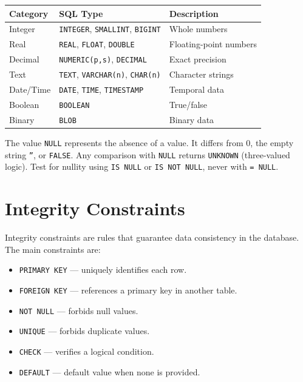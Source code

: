 \begin{keyformulas}[title=\textbf{Common SQL Data Types}]
\begin{center}
\begin{tabular}{lll}
\toprule
\textbf{Category} & \textbf{SQL Type} & \textbf{Description} \\
\midrule
Integer & \texttt{INTEGER}, \texttt{SMALLINT}, \texttt{BIGINT} & Whole numbers \\
Real & \texttt{REAL}, \texttt{FLOAT}, \texttt{DOUBLE} & Floating-point numbers \\
Decimal & \texttt{NUMERIC(p,s)}, \texttt{DECIMAL} & Exact precision \\
Text & \texttt{TEXT}, \texttt{VARCHAR(n)}, \texttt{CHAR(n)} & Character strings \\
Date/Time & \texttt{DATE}, \texttt{TIME}, \texttt{TIMESTAMP} & Temporal data \\
Boolean & \texttt{BOOLEAN} & True/false \\
Binary & \texttt{BLOB} & Binary data \\
\bottomrule
\end{tabular}
\end{center}
\end{keyformulas}

\begin{warning}[title=\textbf{NULL Is Not Zero}]
The value \texttt{NULL} represents the absence of a value. It differs from
$0$, the empty string \texttt{''}, or \texttt{FALSE}.
Any comparison with \texttt{NULL} returns \texttt{UNKNOWN} (three-valued logic).
Test for nullity using \texttt{IS NULL} or \texttt{IS NOT NULL}, never with \texttt{= NULL}.
\end{warning}

\section{Integrity Constraints}

\begin{definition}
Integrity constraints are rules that guarantee data consistency in the database.
The main constraints are:
\begin{itemize}
    \item \texttt{PRIMARY KEY} --- uniquely identifies each row.
    \item \texttt{FOREIGN KEY} --- references a primary key in another table.
    \item \texttt{NOT NULL} --- forbids null values.
    \item \texttt{UNIQUE} --- forbids duplicate values.
    \item \texttt{CHECK} --- verifies a logical condition.
    \item \texttt{DEFAULT} --- default value when none is provided.
\end{itemize}
\end{definition}

